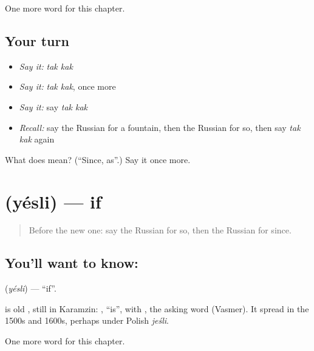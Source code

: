 \begin{grammarlens}[title={What you've built}]
One more word for this chapter.
\end{grammarlens}

\subsection*{Your turn}
\begin{itemize}
\raggedright
  \item \emph{Say it:} \emph{tak kak}
  \item \emph{Say it:} \emph{tak kak}, once more
  \item \emph{Say it:} say \emph{tak kak}
  \item \emph{Recall:} say the Russian for a fountain, then the Russian for so, then say \emph{tak kak} again
\end{itemize}

\begin{tcolorbox}[breakable,colback=teal!4,colframe=teal!35!black,title={Before you move on}]
What does   mean? (\textquotedblleft{}Since, as\textquotedblright{}.) Say it once more.
\end{tcolorbox}
\section[\texorpdfstring{\ru{если} (yésli)}{если (yésli)}]{ (yésli) — if}

\label{lesson:RU-C154-yesli}



\begin{quote}
Before the new one: say the Russian for so, then the Russian for since.
\end{quote}

\subsection*{You'll want to know: }
\textbf{} (\emph{yésli}) — \textquotedblleft{}if\textquotedblright{}.

\begin{cousinweb}
\textbf{} is old \emph{}, still in Karamzin: \emph{}, \textquotedblleft{}is\textquotedblright{}, with \emph{}, the asking word (Vasmer). It spread in the 1500s and 1600s, perhaps under Polish \emph{jeśli}.
\end{cousinweb}

\begin{grammarlens}[title={What you've built}]
One more word for this chapter.
\end{grammarlens}

